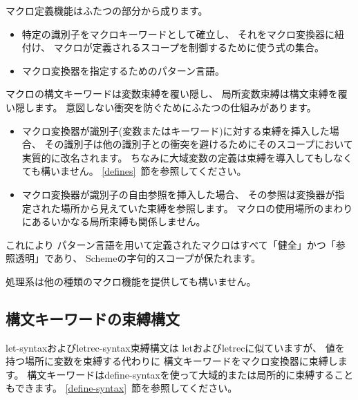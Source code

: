 マクロ定義機能はふたつの部分から成ります。

\begin{itemize}
\item 特定の識別子をマクロキーワードとして確立し、
それをマクロ変換器に紐付け、
マクロが定義されるスコープを制御するために使う式の集合。

\item マクロ変換器を指定するためのパターン言語。
\end{itemize}

マクロの構文キーワードは変数束縛を覆い隠し、
局所変数束縛は構文束縛を覆い隠します。
意図しない衝突を防ぐためにふたつの仕組みがあります。

\begin{itemize}

\item マクロ変換器が識別子(変数またはキーワード)に対する束縛を挿入した場合、
その識別子は他の識別子との衝突を避けるためにそのスコープにおいて実質的に改名されます。
ちなみに大域変数の定義は束縛を導入してもしなくても構いません。
\ref{defines}~節を参照してください。

\item マクロ変換器が識別子の自由参照を挿入した場合、
その参照は変換器が指定された場所から見えていた束縛を参照します。
マクロの使用場所のまわりにあるいかなる局所束縛も関係しません。

\end{itemize}

これにより
パターン言語を用いて定義されたマクロはすべて「健全」かつ「参照透明」であり、
Schemeの字句的スコープが保たれます。\cite{Kohlbecker86,
hygienic,Bawden88,macrosthatwork,syntacticabstraction}

処理系は他の種類のマクロ機能を提供しても構いません。

\subsection{構文キーワードの束縛構文}
\label{bindsyntax}

{\cf let-syntax}および{\cf letrec-syntax}束縛構文は
{\cf let}および{\cf letrec}に似ていますが、
値を持つ場所に変数を束縛する代わりに
構文キーワードをマクロ変換器に束縛します。
構文キーワードは{\cf define-syntax}を使って大域的または局所的に束縛することもできます。
\ref{define-syntax}~節を参照してください。

